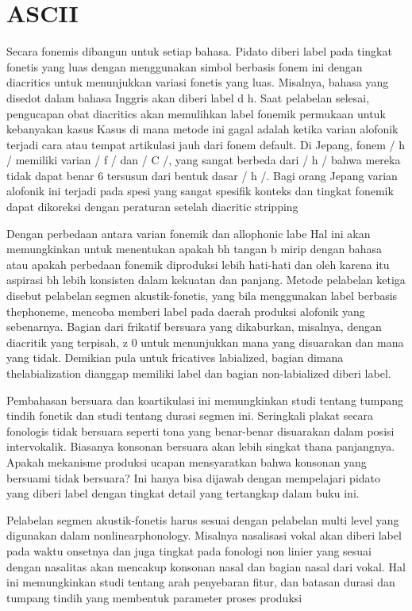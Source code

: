 \section{ASCII}
Secara fonemis dibangun untuk setiap bahasa.
Pidato diberi label pada tingkat fonetis yang luas dengan menggunakan simbol berbasis fonem ini dengan diacritics
untuk menunjukkan variasi fonetis yang luas. Misalnya, bahasa yang disedot dalam bahasa Inggris akan diberi label d h.
Saat pelabelan selesai, pengucapan obat diacritics akan memulihkan label fonemik permukaan
untuk kebanyakan kasus Kasus di mana metode ini gagal adalah ketika varian alofonik terjadi
cara atau tempat artikulasi jauh dari fonem default. Di Jepang, fonem / h /
memiliki varian / f / dan / C /, yang sangat berbeda dari / h / bahwa mereka tidak dapat benar 6
tersusun dari bentuk dasar / h /. Bagi orang Jepang varian alofonik ini terjadi pada spesi yang sangat spesifik
konteks dan tingkat fonemik dapat dikoreksi dengan peraturan setelah diacritic stripping

Dengan perbedaan antara varian fonemik dan allophonic labe Hal ini akan memungkinkan untuk menentukan apakah bh tangan b mirip dengan bahasa atau apakah perbedaan fonemik diproduksi lebih hati-hati dan oleh karena itu aspirasi bh lebih konsisten dalam kekuatan dan panjang. Metode pelabelan ketiga disebut pelabelan segmen akustik-fonetis, yang bila menggunakan label berbasis thephoneme, mencoba memberi label pada daerah produksi alofonik yang sebenarnya. Bagian dari frikatif bersuara yang dikaburkan, misalnya, dengan diacritik yang terpisah, z 0 untuk menunjukkan mana yang disuarakan dan mana yang tidak. Demikian pula untuk fricatives labialized, bagian dimana thelabialization dianggap memiliki label dan bagian non-labialized diberi label. 

Pembahasan bersuara dan koartikulasi ini memungkinkan studi tentang tumpang tindih fonetik dan studi tentang durasi segmen ini. Seringkali plakat secara fonologis tidak bersuara seperti tona yang benar-benar disuarakan dalam posisi intervokalik. Biasanya konsonan bersuara akan lebih singkat thana panjangnya. Apakah mekanisme produksi ucapan mensyaratkan bahwa konsonan yang bersuami tidak bersuara? Ini hanya bisa dijawab dengan mempelajari pidato yang diberi label dengan tingkat detail yang tertangkap dalam buku ini. 

Pelabelan segmen akustik-fonetis harus sesuai dengan pelabelan multi level yang digunakan dalam nonlinearphonology. Misalnya nasalisasi vokal akan diberi label pada waktu onsetnya dan juga tingkat pada fonologi non linier yang sesuai dengan nasalitas akan mencakup konsonan nasal dan bagian nasal dari vokal. Hal ini memungkinkan studi tentang arah penyebaran fitur, dan batasan durasi dan tumpang tindih yang membentuk parameter proses produksi 	